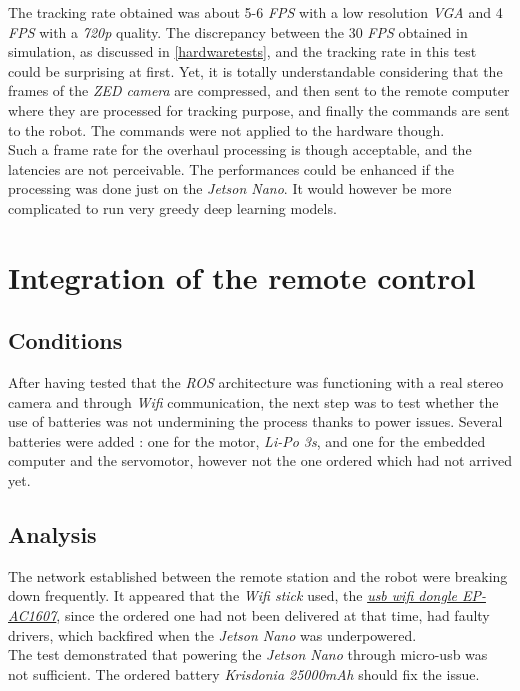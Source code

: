 		The tracking rate obtained was about 5-6 \textit{FPS} with 
		a low resolution \textit{VGA} and 4 \textit{FPS} with a \textit{720p} quality.
		The discrepancy between the 30 \textit{FPS} obtained
		in simulation, as discussed in \vref{hardwaretests}, and the 
		tracking rate in this test could be surprising at first.
		Yet, it is totally understandable considering that the 
		frames of the \textit{ZED camera} are compressed, and then sent
		to the remote computer where they are processed for tracking 
		purpose, and finally the commands are sent to the robot. 
		The commands were not applied to the hardware though.
		\\\indent Such a frame rate for the overhaul processing 
		is though acceptable, and the latencies are not 
		perceivable. The performances could be enhanced if the 
		processing was done just on the \textit{Jetson Nano}.
		It would however be more complicated to run very 
		greedy deep learning models.

	\section{Integration of the remote control}
	
		\subsection{Conditions}
		
		After having tested that the \textit{ROS} architecture
		was functioning with a real stereo camera and through 
		\textit{Wifi} communication,  the next step was to test
		whether the use of batteries was not undermining the 
		process thanks to power issues. Several batteries 
		were added : one for the motor, \textit{Li-Po 3s}, and 
		one for the embedded computer and the servomotor, however 
		not the one ordered which had not arrived yet. 
	
		\subsection{Analysis}
		
		The network established between 
		the remote station and the robot were breaking down frequently.
		It appeared that the \textit{Wifi stick} used, the
		\href{https://www.miniinthebox.com/en/p/5ghz-usb-wifi-adapter-600mbps-wifi-antenna-2dbi-support-windows-mac-802-11ac-usb-network-card-wifi-dongle-for-desktop-laptop-pc\_p5957285.html?prm=2.3.5.1}{\textit{usb wifi dongle EP-AC1607}}, since the 
		ordered one had not been delivered at that time, had 
		faulty drivers, which backfired when the \textit{Jetson Nano} was
		underpowered.
		\\\indent The test demonstrated that powering the 
		\textit{Jetson Nano} through micro-usb was not 
		sufficient. The ordered battery \textit{Krisdonia 25000mAh}
		should fix the issue.
		
